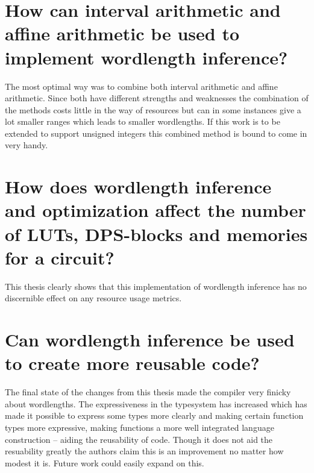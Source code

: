 \section{How can interval arithmetic and affine arithmetic be used to implement wordlength inference?}
The most optimal way was to combine both interval arithmetic and affine arithmetic. Since both have different strengths and weaknesses the combination of the methods costs little in the way of resources but can in some instances give a lot smaller ranges which leads to smaller wordlengths. If this work is to be extended to support unsigned integers this combined method is bound to come in very handy. 

\section{How does wordlength inference and optimization affect the number of LUTs, DPS-blocks and memories for a circuit?}
This thesis clearly shows that this implementation of wordlength inference has no discernible effect on any resource usage metrics.

\section{Can wordlength inference be used to create more reusable code?}
The final state of the changes from this thesis made the compiler very finicky about wordlengths. The expressiveness in the typesystem has increased which has made it possible to express some types more clearly and making certain function types more expressive, making functions a more well integrated language construction -- aiding the reusability of code. Though it does not aid the resuability greatly the authors claim this is an improvement no matter how modest it is. Future work could easily expand on this.


